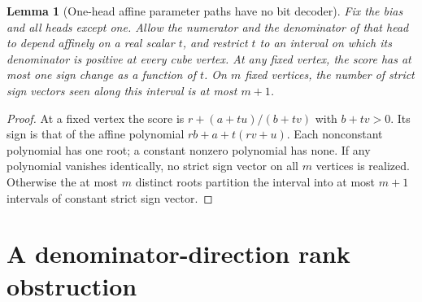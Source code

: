 \documentclass[11pt]{article}
\newtheorem{lemma}[proposition]{Lemma}
\begin{document}
\begin{lemma}[One-head affine parameter paths have no bit decoder]
Fix the bias and all heads except one. Allow the numerator and the
denominator of that head to depend affinely on a real scalar $t$,
and restrict $t$ to an interval on which its denominator is positive
at every cube vertex. At any fixed vertex, the score has at most one
sign change as a function of $t$. On $m$ fixed vertices, the number of
strict sign vectors seen along this interval is at most $m+1$.
\end{lemma}
\begin{proof}
At a fixed vertex the score is
$r+(a+tu)/(b+tv)$ with $b+tv>0$. Its sign is that of the affine
polynomial $rb+a+t(rv+u)$. Each nonconstant polynomial has one root;
a constant nonzero polynomial has none. If any polynomial vanishes
identically, no strict sign vector on all $m$ vertices is realized.
Otherwise the at most $m$ distinct roots partition the interval into
at most $m+1$ intervals of constant strict sign vector.
\end{proof}

\section{A denominator-direction rank obstruction}
\end{document}
